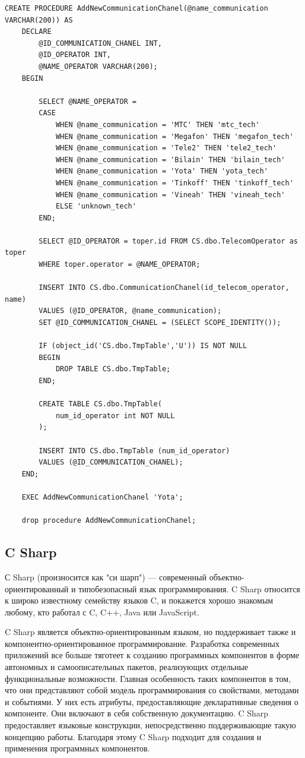 \begin{lstlisting}[caption=Процедура для добавления нового канала коммуникации, label = list:AddNewCommunicationChanel]
	CREATE PROCEDURE AddNewCommunicationChanel(@name_communication VARCHAR(200)) AS
	DECLARE 
		@ID_COMMUNICATION_CHANEL INT,
		@ID_OPERATOR INT,
		@NAME_OPERATOR VARCHAR(200);
	BEGIN

		SELECT @NAME_OPERATOR = 
		CASE 
			WHEN @name_communication = 'MTC' THEN 'mtc_tech'
			WHEN @name_communication = 'Megafon' THEN 'megafon_tech'
			WHEN @name_communication = 'Tele2' THEN 'tele2_tech'
			WHEN @name_communication = 'Bilain' THEN 'bilain_tech'
			WHEN @name_communication = 'Yota' THEN 'yota_tech'
			WHEN @name_communication = 'Tinkoff' THEN 'tinkoff_tech'
			WHEN @name_communication = 'Vineah' THEN 'vineah_tech'
			ELSE 'unknown_tech'
		END;

		SELECT @ID_OPERATOR = toper.id FROM CS.dbo.TelecomOperator as toper
		WHERE toper.operator = @NAME_OPERATOR;

		INSERT INTO CS.dbo.CommunicationChanel(id_telecom_operator, name)
		VALUES (@ID_OPERATOR, @name_communication);
		SET @ID_COMMUNICATION_CHANEL = (SELECT SCOPE_IDENTITY());

		IF (object_id('CS.dbo.TmpTable','U')) IS NOT NULL
		BEGIN
			DROP TABLE CS.dbo.TmpTable;
		END;

		CREATE TABLE CS.dbo.TmpTable(
			num_id_operator int NOT NULL
		);

		INSERT INTO CS.dbo.TmpTable (num_id_operator)
		VALUES (@ID_COMMUNICATION_CHANEL);
	END;

	EXEC AddNewCommunicationChanel 'Yota';
	
	drop procedure AddNewCommunicationChanel;

\end{lstlisting}


\subsection{C Sharp}

\vspace{0.5cm}
\hspace{0.6cm}
С Sharp (произносится как "си шарп") — современный объектно-ориентированный и типобезопасный язык программирования. C Sharp относится к широко известному семейству языков C, и покажется хорошо знакомым любому, кто работал с C, C++, Java или JavaScript.

\vspace{0.1cm}
C Sharp является объектно-ориентированным языком, но поддерживает также и компонентно-ориентированное программирование. Разработка современных приложений все больше тяготеет к созданию программных компонентов в форме автономных и самоописательных пакетов, реализующих отдельные функциональные возможности. Главная особенность таких компонентов в том, что они представляют собой модель программирования со свойствами, методами и событиями. У них есть атрибуты, предоставляющие декларативные сведения о компоненте. Они включают в себя собственную документацию. C Sharp предоставляет языковые конструкции, непосредственно поддерживающие такую концепцию работы. Благодаря этому C Sharp подходит для создания и применения программных компонентов\cite{microsoft-csharp}.

